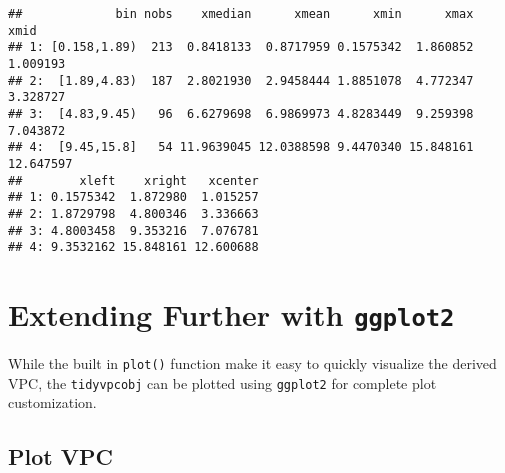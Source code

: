 \documentclass[
]{book}
\begin{document}
\begin{verbatim}
##             bin nobs    xmedian      xmean      xmin      xmax      xmid
## 1: [0.158,1.89)  213  0.8418133  0.8717959 0.1575342  1.860852  1.009193
## 2:  [1.89,4.83)  187  2.8021930  2.9458444 1.8851078  4.772347  3.328727
## 3:  [4.83,9.45)   96  6.6279698  6.9869973 4.8283449  9.259398  7.043872
## 4:  [9.45,15.8]   54 11.9639045 12.0388598 9.4470340 15.848161 12.647597
##        xleft    xright   xcenter
## 1: 0.1575342  1.872980  1.015257
## 2: 1.8729798  4.800346  3.336663
## 3: 4.8003458  9.353216  7.076781
## 4: 9.3532162 15.848161 12.600688
\end{verbatim}

\hypertarget{ggplot2}{%
\chapter{\texorpdfstring{Extending Further with \texttt{ggplot2}}{Extending Further with ggplot2}}\label{ggplot2}}

While the built in \texttt{plot()} function make it easy to quickly visualize the derived VPC, the \texttt{tidyvpcobj} can be plotted using \texttt{ggplot2} for complete plot customization.

\hypertarget{plot-vpc}{%
\section{Plot VPC}\label{plot-vpc}}
\end{document}
